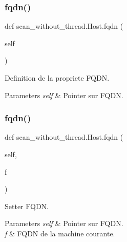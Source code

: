 \subsubsection{\texorpdfstring{fqdn()}{fqdn()}\hspace{0.1cm}{\footnotesize\ttfamily [1/2]}}
{\footnotesize\ttfamily def scan\+\_\+without\+\_\+thread.\+Host.\+fqdn (\begin{DoxyParamCaption}\item[{}]{self }\end{DoxyParamCaption})}



Definition de la propriete F\+Q\+DN. 


\begin{DoxyParams}{Parameters}
{\em self} & Pointer sur F\+Q\+DN. \\
\hline
\end{DoxyParams}
\hypertarget{classscan__without__thread_1_1Host_ae71ed46288fcc1e3784324227478700b}{}\label{classscan__without__thread_1_1Host_ae71ed46288fcc1e3784324227478700b} 
\subsubsection{\texorpdfstring{fqdn()}{fqdn()}\hspace{0.1cm}{\footnotesize\ttfamily [2/2]}}
{\footnotesize\ttfamily def scan\+\_\+without\+\_\+thread.\+Host.\+fqdn (\begin{DoxyParamCaption}\item[{}]{self,  }\item[{}]{f }\end{DoxyParamCaption})}



Setter F\+Q\+DN. 


\begin{DoxyParams}{Parameters}
{\em self} & Pointer sur F\+Q\+DN. \\
\hline
{\em f} & F\+Q\+DN de la machine courante. \\
\hline
\end{DoxyParams}
\hypertarget{classscan__without__thread_1_1Host_a2480e26491f7315e7d9f214497c45944}{}\label{classscan__without__thread_1_1Host_a2480e26491f7315e7d9f214497c45944} 
